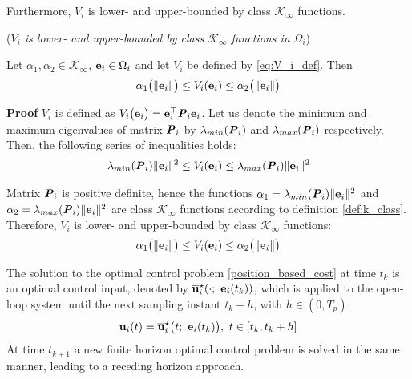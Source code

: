 Furthermore, $V_i$ is lower- and upper-bounded by class $\mathcal{K}_{\infty}$ functions.

\begin{bw_box}
  \begin{lemma} (\textit{$V_i$ is lower- and upper-bounded by class
      \label{lemma:V_i_lower_upper_bounded}
    $\mathcal{K}_{\infty}$ functions in $\Omega_i$})
  \end{lemma}

  Let $\alpha_1, \alpha_2 \in \mathcal{K}_{\infty}$, $\bm{\mathbf{e}}_i \in \Omega_i$
  and let $V_i$ be defined by \eqref{eq:V_i_def}. Then
  \begin{align}
    \alpha_1\big(\|\bm{\mathbf{e}}_i\|\big) \leq V_i(\bm{\mathbf{e}}_i) \leq \alpha_2\big(\| \bm{\mathbf{e}}_i \|\big)
  \end{align}

\end{bw_box}

\begin{gg_box}
  \textbf{Proof}
  $V_i$ is defined as
  $V_i\big(\bm{\mathbf{e}}_i\big) = \bm{\mathbf{e}}_i^{\top} \bm{\mathit{P}}_i \bm{\mathbf{e}}_i$.
  Let us denote the minimum and maximum eigenvalues of matrix $\bm{\mathit{P}}_i$ by
  $\lambda_{min}(\bm{\mathit{P}}_i)$ and $\lambda_{max}(\bm{\mathit{P}}_i)$ respectively.
  Then, the following series of inequalities holds:
\begin{align}
  \lambda_{min}(\bm{\mathit{P}}_i) \|\bm{\mathbf{e}}_i\|^2 \leq V_i(\bm{\mathbf{e}}_i) \leq \lambda_{max}(\bm{\mathit{P}}_i) \|\bm{\mathbf{e}}_i\|^2
\end{align}

Matrix $\bm{\mathit{P}}_i$ is positive definite, hence the functions
$\alpha_1 = \lambda_{min}(\bm{\mathit{P}}_i) \|\bm{\mathbf{e}}_i\|^2$ and
$\alpha_2 = \lambda_{max}(\bm{\mathit{P}}_i) \|\bm{\mathbf{e}}_i\|^2$ are
class $\mathcal{K}_{\infty}$ functions according to definition \eqref{def:k_class}.
Therefore, $V_i$ is lower- and upper-bounded by class $\mathcal{K}_{\infty}$
functions:
\begin{align}
  \alpha_1\big(\|\bm{\mathbf{e}}_i\|\big) \leq V_i(\bm{\mathbf{e}}_i) \leq \alpha_2\big(\| \bm{\mathbf{e}}_i \|\big)
\end{align}
\qedsymbol
\end{gg_box}


The solution to the optimal control problem \eqref{position_based_cost}
at time $t_k$ is an optimal control input, denoted by
$\overline{\bm{\mathbf{u}}}_i^{\star}(\cdot;\ \bm{\mathbf{e}}_i(t_k))$, which
is applied to the open-loop system until the next sampling instant $t_k + h$,
with $h \in (0,T_p)$:
\begin{align}
  \bm{\mathbf{u}}_i(t) = \overline{\bm{\mathbf{u}}}_i^{\star}\big(t;\ \bm{\mathbf{e}}_i(t_k)\big),\  t \in [t_k, t_k + h]
 \label{eq:position_based_optimal_u}
\end{align}
At time $t_{k+1}$ a new finite horizon optimal control problem is solved in the
same manner, leading to a receding horizon approach.

